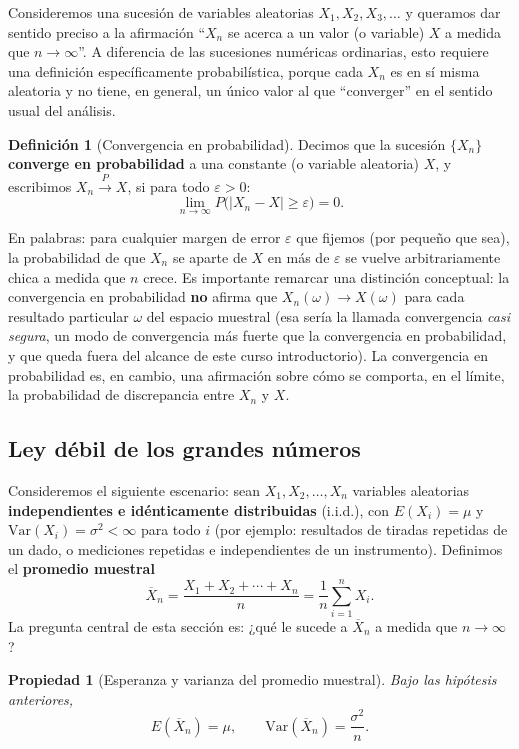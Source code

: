 \documentclass[11pt,a4paper]{article}
\theoremstyle{plain}
\newtheorem{propiedad}[teorema]{Propiedad}
\theoremstyle{definition}
\newtheorem{definicion}[teorema]{Definición}
\theoremstyle{remark}
\begin{document}
Consideremos una sucesión de variables aleatorias $X_1,X_2,X_3,\dots$ y queramos dar sentido preciso a la afirmación ``$X_n$ se acerca a un valor (o variable) $X$ a medida que $n\to\infty$''. A diferencia de las sucesiones numéricas ordinarias, esto requiere una definición específicamente probabilística, porque cada $X_n$ es en sí misma aleatoria y no tiene, en general, un único valor al que ``converger'' en el sentido usual del análisis.

\begin{definicion}[Convergencia en probabilidad]
Decimos que la sucesión $\{X_n\}$ \textbf{converge en probabilidad} a una constante (o variable aleatoria) $X$, y escribimos $X_n \xrightarrow{P} X$, si para todo $\varepsilon>0$:
\[
\lim_{n\to\infty} P\big(|X_n-X|\geq\varepsilon\big) = 0.
\]
\end{definicion}

En palabras: para cualquier margen de error $\varepsilon$ que fijemos (por pequeño que sea), la probabilidad de que $X_n$ se aparte de $X$ en más de $\varepsilon$ se vuelve arbitrariamente chica a medida que $n$ crece. Es importante remarcar una distinción conceptual: la convergencia en probabilidad \textbf{no} afirma que $X_n(\omega)\to X(\omega)$ para cada resultado particular $\omega$ del espacio muestral (esa sería la llamada convergencia \emph{casi segura}, un modo de convergencia más fuerte que la convergencia en probabilidad, y que queda fuera del alcance de este curso introductorio). La convergencia en probabilidad es, en cambio, una afirmación sobre cómo se comporta, en el límite, la probabilidad de discrepancia entre $X_n$ y $X$.

\subsection{Ley débil de los grandes números}

Consideremos el siguiente escenario: sean $X_1,X_2,\dots,X_n$ variables aleatorias \textbf{independientes e idénticamente distribuidas} (i.i.d.), con $E(X_i)=\mu$ y $\text{Var}(X_i)=\sigma^2<\infty$ para todo $i$ (por ejemplo: resultados de tiradas repetidas de un dado, o mediciones repetidas e independientes de un instrumento). Definimos el \textbf{promedio muestral}
\[
\overline{X}_n = \frac{X_1+X_2+\cdots+X_n}{n} = \frac1n\sum_{i=1}^n X_i.
\]
La pregunta central de esta sección es: ¿qué le sucede a $\overline{X}_n$ a medida que $n\to\infty$?

\begin{propiedad}[Esperanza y varianza del promedio muestral]
Bajo las hipótesis anteriores,
\[
E(\overline{X}_n) = \mu, \qquad \text{Var}(\overline{X}_n) = \frac{\sigma^2}{n}.
\]
\end{propiedad}
\end{document}
